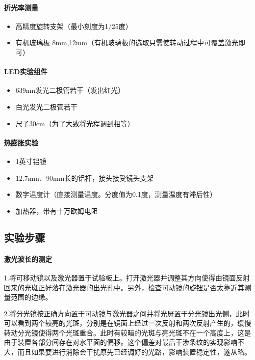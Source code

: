 \documentclass[10pt]{ctexart}
\begin{document}
\paragraph{折光率测量}
\begin{itemize}
    \item 高精度旋转支架（最小刻度为1/25度）
    \item 有机玻璃板 8mm,12mm（有机玻璃板的选取只需使转动过程中可覆盖激光即可）
\end{itemize}
\paragraph{LED实验组件}
\begin{itemize}
    \item 639nm发光二极管若干（发出红光）
    \item 白光发光二极管若干
    \item 尺子30cm（为了大致将光程调到相等）
\end{itemize}
\paragraph{热膨胀实验}
\begin{itemize}
    \item 1英寸铝镜
    \item 12.7mm、90mm长的铝杆，接头接受镜头支架
    \item 数字温度计（直接测量温度。分度值为0.1度，测量温度有滞后性）
    \item 加热器，带有十万欧姆电阻
\end{itemize}
\subsection{实验步骤}
\paragraph{激光波长的测定}\mbox{}

1.将可移动镜以及激光器置于试验板上。打开激光器并调整其方向使得由镜面反射回来的光斑正好落在激光器的出光孔中。另外，检查可动镜的旋钮是否太靠近其测量范围的边缘。

2.将分光镜按正确方向置于可动镜与激光器之间并将光屏置于分光镜出光侧，此时可以看到两个较亮的光斑，分别是在镜面上经过一次反射和两次反射产生的，缓慢转动分光镜使得两个光斑重合。此时有较暗的光斑与亮光斑不在一个高度上，这是由于装置各部分间存在对水平面的偏移。这个偏差对最后干涉条纹的实现影响不大，而且如果要进行消除会干扰原先已经调好的光路，影响装置稳定性，遂从略。
\end{document}
